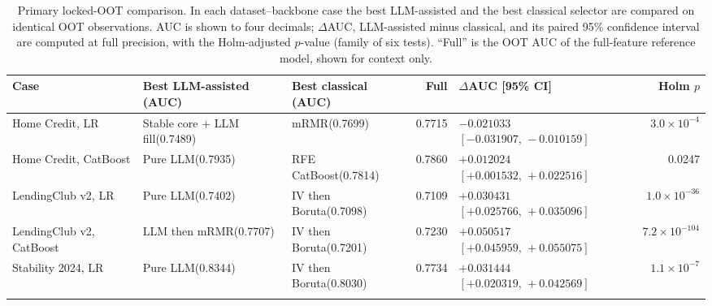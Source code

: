 \documentclass[final,5p,twocolumn]{elsarticle}
\begin{document}
\begin{table}[htbp]
\centering
\scriptsize
\setlength{\tabcolsep}{3pt}
\begin{threeparttable}
\caption{Primary locked-OOT comparison. In each dataset--backbone case the best LLM-assisted and the best classical selector are compared on identical OOT observations. AUC is shown to four decimals; $\Delta$AUC, LLM-assisted minus classical, and its paired 95\% confidence interval are computed at full precision, with the Holm-adjusted $p$-value (family of six tests). ``Full'' is the OOT AUC of the full-feature reference model, shown for context only.}
\label{tab:primary_results}
\begin{tabular}{@{}L{21mm}L{25mm}L{22mm}rL{36mm}r@{}}
\toprule
Case & Best LLM-assisted (AUC) & Best classical (AUC) & Full & $\Delta$AUC [95\% CI] & Holm $p$ \\
\midrule
Home Credit, LR & Stable core + LLM fill\newline (0.7489) & mRMR\newline (0.7699) & 0.7715 & $-0.021033$\newline $[-0.031907,\,-0.010159]$ & $3.0\times10^{-4}$ \\
\addlinespace
Home Credit, CatBoost & Pure LLM\newline (0.7935) & RFE CatBoost\newline (0.7814) & 0.7860 & $+0.012024$\newline $[+0.001532,\,+0.022516]$ & 0.0247 \\
\addlinespace
LendingClub v2, LR & Pure LLM\newline (0.7402) & IV then Boruta\newline (0.7098) & 0.7109 & $+0.030431$\newline $[+0.025766,\,+0.035096]$ & $1.0\times10^{-36}$ \\
\addlinespace
LendingClub v2, CatBoost & LLM then mRMR\newline (0.7707) & IV then Boruta\newline (0.7201) & 0.7230 & $+0.050517$\newline $[+0.045959,\,+0.055075]$ & $7.2\times10^{-104}$ \\
\addlinespace
Stability 2024, LR & Pure LLM\newline (0.8344) & IV then Boruta\newline (0.8030) & 0.7734 & $+0.031444$\newline $[+0.020319,\,+0.042569]$ & $1.1\times10^{-7}$ \\
\addlinespace

\end{tabular}
\end{threeparttable}
\end{table}
\end{document}
